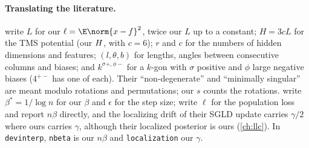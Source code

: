 \begin{refsection}
\paragraph{Translating the literature.} \Textcite{ChenEtAl2023} write $L$ for our $\ell=\E\norm{x-f}^2$, twice our $L$ up to a constant; $H=3cL$ for the TMS potential (our $H$, with $c=6$); $r$ and $c$ for the numbers of hidden dimensions and features; $(l,\theta,b)$ for lengths, angles between consecutive columns and biases; and $k^{\sigma+,\phi-}$ for a $k$-gon with $\sigma$ positive and $\phi$ large negative biases ($4^{+-}$ has one of each). Their ``non-degenerate'' and ``minimally singular'' are meant modulo rotations and permutations; our $s$ counts the rotations. \Textcite{LauEtAl2025} write $\beta^*=1/\log n$ for our $\beta$ and $\epsilon$ for the step size; \textcite{HooglandEtAl2025} write $\ell$ for the population loss and report $n\beta$ directly, and the localizing drift of their SGLD update carries $\gamma/2$ where ours carries $\gamma$, although their localized posterior is ours (\cref{ch:llc}). In \texttt{devinterp}, \texttt{nbeta} is our $n\beta$ and \texttt{localization} our $\gamma$.

\printchapterbib
\end{refsection}
